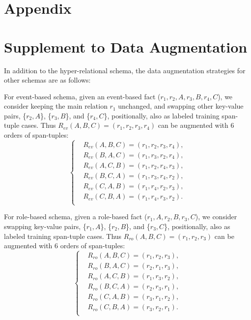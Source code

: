 \documentclass{article} \usepackage{iclr2024_conference,times}
\begin{document}


\newpage
\appendix
\section*{Appendix} 

\section{Supplement to Data Augmentation}
\label{AppA}

In addition to the hyper-relational schema, the data augmentation strategies for other schemas are as follows:

For event-based schema, given an event-based fact ($r_1,r_2,A,r_3,B,r_4,C$), we consider keeping the main relation $r_1$ unchanged, and swapping other key-value pairs, \{$r_2,A$\}, \{$r_3,B$\}, and \{$r_4,C$\}, positionally, also as labeled training span-tuple cases. Thus $R_{ev}(A,B,C)=(r_1,r_2,r_3,r_4)$ can be augmented with 6 orders of span-tuples:
\begin{equation}
\left\{
\begin{aligned}
&R_{ev}(A,B,C)=(r_1,r_2,r_3,r_4),\\
&R_{ev}(B,A,C)=(r_1,r_3,r_2,r_4),\\
&R_{ev}(A,C,B)=(r_1,r_2,r_4,r_3),\\
&R_{ev}(B,C,A)=(r_1,r_3,r_4,r_2),\\
&R_{ev}(C,A,B)=(r_1,r_4,r_2,r_3),\\
&R_{ev}(C,B,A)=(r_1,r_4,r_3,r_2).\\
\end{aligned}
\right.
\end{equation}

For role-based schema, given a role-based fact ($r_1,A,r_2,B,r_3,C$), we consider swapping key-value pairs, \{$r_1,A$\}, \{$r_2,B$\}, and \{$r_3,C$\}, positionally, also as labeled training span-tuple cases. Thus $R_{ro}(A,B,C)=(r_1,r_2,r_3)$ can be augmented with 6 orders of span-tuples:
\begin{equation}
\left\{
\begin{aligned}
&R_{ro}(A,B,C)=(r_1,r_2,r_3),\\
&R_{ro}(B,A,C)=(r_2,r_1,r_3),\\
&R_{ro}(A,C,B)=(r_1,r_3,r_2),\\
&R_{ro}(B,C,A)=(r_2,r_3,r_1),\\
&R_{ro}(C,A,B)=(r_3,r_1,r_2),\\
&R_{ro}(C,B,A)=(r_3,r_2,r_1).\\
\end{aligned}
\right.
\end{equation}
\end{document}

